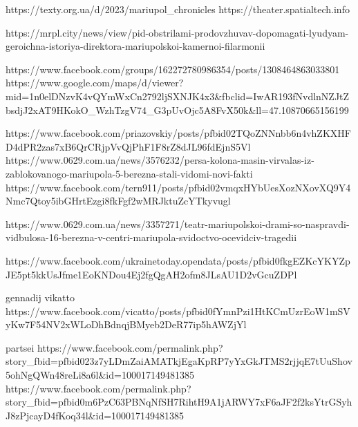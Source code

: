  
 
 
 
 


https://texty.org.ua/d/2023/mariupol_chronicles
https://theater.spatialtech.info

https://mrpl.city/news/view/pid-obstrilami-prodovzhuvav-dopomagati-lyudyam-geroichna-istoriya-direktora-mariupolskoi-kamernoi-filarmonii

https://www.facebook.com/groups/162272780986354/posts/1308464863033801
https://www.google.com/maps/d/viewer?mid=1n0elDNzvK4vQYmWxCn2792ljSXNJK4x3&fbclid=IwAR193fNvdlnNZJtZbsdjJ2xAT9HKokO_WzhTzgV74_G3pUvOjc5A8FvX50k&ll=47.10870665156199%

https://www.facebook.com/priazovskiy/posts/pfbid02TQoZNNnbb6n4vhZKXHFD4dPR2zas7xB6QrCRjpVvQjPhF1F8rZ8dJL96fdEjnS5Vl
https://www.0629.com.ua/news/3576232/persa-kolona-masin-virvalas-iz-zablokovanogo-mariupola-5-berezna-stali-vidomi-novi-fakti
https://www.facebook.com/tern911/posts/pfbid02vmqxHYbUesXozNXovXQ9Y4Nmc7Qtoy5ibGHrtEzgi8fkFgf2wMRJktuZcYTkyvugl

https://www.0629.com.ua/news/3357271/teatr-mariupolskoi-drami-so-naspravdi-vidbulosa-16-berezna-v-centri-mariupola-svidoctvo-ocevidciv-tragedii

https://www.facebook.com/ukrainetoday.opendata/posts/pfbid0fkgEZKcYKYZpJE5pt5kkUsJfme1EoKNDou4Ej2fgQgAH2ofm8JLsAU1D2vGcuZDPl

gennadij vikatto
https://www.facebook.com/vicatto/posts/pfbid0fYmnPzi1HtKCmUzrEoW1mSVyKw7F54NV2xWLoDhBdnqjBMyeb2DeR77ip5hAWZjYl

partsei
https://www.facebook.com/permalink.php?story_fbid=pfbid023z7yLDmZaiAMATkjEgaKpRP7yYxGkJTMS2rjjqE7tUuShov5ohNgQWn48reLi8a6l&id=100017149481385
https://www.facebook.com/permalink.php?story_fbid=pfbid0m6PzC63PBNqNfSH7RihtH9A1jARWY7xF6aJF2f2ksYtrGSyhJ8zPjcayD4fKoq34l&id=100017149481385
